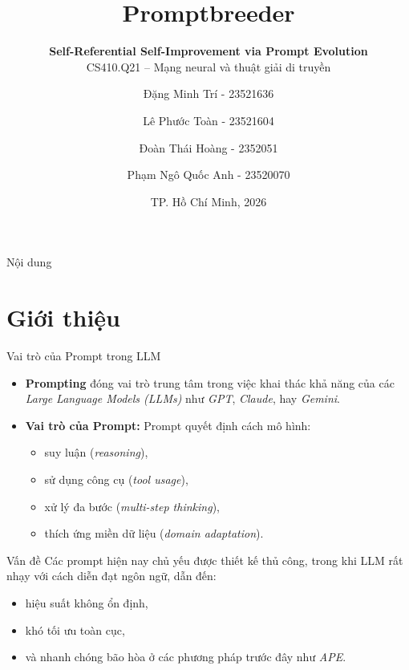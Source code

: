 \documentclass[english,main=vietnamese,xcolor=table]{beamer}
\title[Nhóm Prompt]{\textbf{Promptbreeder}}
\subtitle{\LARGE \textbf{Self-Referential Self-Improvement via Prompt Evolution} \\[6pt] 
\normalsize CS410.Q21 – Mạng neural và thuật giải di truyền}
\author[]{
Đặng Minh Trí - 23521636 \and
Lê Phước Toàn - 23521604 \and
Đoàn Thái Hoàng - 2352051 \and
Phạm Ngô Quốc Anh - 23520070
}
\institute[UIT-VNUHCM]{
Trường Đại học Công nghệ Thông tin\\
Đại học Quốc gia TP.HCM
}
\date{TP. Hồ Chí Minh, 2026}
\begin{document}

\begin{frame}
  \titlepage
\end{frame}

\begin{frame}{Nội dung}
  \tableofcontents[hideallsubsections]
\end{frame}


\section{Giới thiệu}
\begin{frame}{Vai trò của Prompt trong LLM}

\begin{itemize}
    \setlength{\itemsep}{10pt}

    \item \textbf{Prompting} đóng vai trò trung tâm trong việc khai thác khả năng của các \textit{Large Language Models (LLMs)} như \textit{GPT}, \textit{Claude}, hay \textit{Gemini}.

    \item \textbf{Vai trò của Prompt:}
    Prompt quyết định cách mô hình:
    \begin{itemize}
        \item suy luận (\textit{reasoning}),
        \item sử dụng công cụ (\textit{tool usage}),
        \item xử lý đa bước (\textit{multi-step thinking}),
        \item thích ứng miền dữ liệu (\textit{domain adaptation}).
    \end{itemize}

\end{itemize}

\vspace{0.3em}

\begin{alertblock}{Vấn đề}
Các prompt hiện nay chủ yếu được thiết kế thủ công, trong khi LLM rất nhạy với cách diễn đạt ngôn ngữ, dẫn đến:
\begin{itemize}
    \item hiệu suất không ổn định,
    \item khó tối ưu toàn cục,
    \item và nhanh chóng bão hòa ở các phương pháp trước đây như \textit{APE}.
\end{itemize}
\end{alertblock}

\end{frame}
\end{document}
